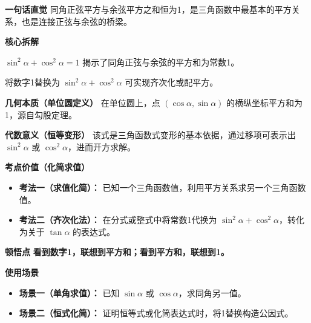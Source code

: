\begin{explanationbox}
	\textbf{\textcolor{CExplanation}{一句话直觉}}
	同角正弦平方与余弦平方之和恒为1，是三角函数中最基本的平方关系，也是连接正弦与余弦的桥梁。

	\medskip
	\textbf{\textcolor{CExplanation}{核心拆解}}
	\begin{description}[style=nextline, leftmargin=2.8em, labelsep=0.5em, itemsep=0.45em]
		\item[\textbf{要点一（平方关系）：}]
			$\sin^2\alpha+\cos^2\alpha=1$ 揭示了同角正弦与余弦的平方和为常数1。
		\item[\textbf{要点二（代换功能）：}]
			将数字1替换为 $\sin^2\alpha+\cos^2\alpha$ 可实现齐次化或配平方。
	\end{description}

	\medskip
	\textbf{\textcolor{CExplanation}{几何本质（单位圆定义）}}
	在单位圆上，点 $(\cos\alpha,\sin\alpha)$ 的横纵坐标平方和为1，源自勾股定理。

	\medskip
	\textbf{\textcolor{CExplanation}{代数意义（恒等变形）}}
	该式是三角函数式变形的基本依据，通过移项可表示出 $\sin^2\alpha$ 或 $\cos^2\alpha$，进而开方求解。

	\medskip
	\textbf{\textcolor{CExplanation}{考点价值（化简求值）}}
	\begin{itemize}[leftmargin=*, itemsep=0.5em, topsep=0.4em]
		\item \textbf{考法一（求值化简）：} 已知一个三角函数值，利用平方关系求另一个三角函数值。
		\item \textbf{考法二（齐次化法）：} 在分式或整式中将常数1代换为 $\sin^2\alpha+\cos^2\alpha$，转化为关于 $\tan\alpha$ 的表达式。
	\end{itemize}

	\medskip
	\textbf{\textcolor{CExplanation}{顿悟点}}
	\textbf{看到数字1，联想到平方和；看到平方和，联想到1。}

	\medskip
	\textbf{\textcolor{CExplanation}{使用场景}}
	\begin{itemize}[leftmargin=*, itemsep=0.5em, topsep=0.4em]
		\item \textbf{场景一（单角求值）：} 已知 $\sin\alpha$ 或 $\cos\alpha$，求同角另一值。
		\item \textbf{场景二（恒式化简）：} 证明恒等式或化简表达式时，将1替换构造公因式。
	\end{itemize}

\end{explanationbox}
